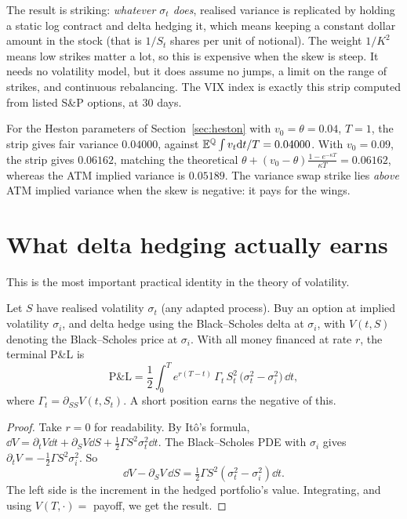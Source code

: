 \begin{intuition}
The result is striking: \emph{whatever $\sigma_t$ does}, realised variance is replicated by holding a static log contract and delta hedging it, which means keeping a constant dollar amount in the stock (that is $1/S_t$ shares per unit of notional). The weight $1/K^2$ means low strikes matter a lot, so this is expensive when the skew is steep. It needs no volatility model, but it does assume no jumps, a limit on the range of strikes, and continuous rebalancing. The VIX index is exactly this strip computed from listed S\&P options, at $30$ days.
\end{intuition}

\begin{numcheck}
For the Heston parameters of Section~\ref{sec:heston} with $v_0=\theta=0.04$, $T=1$, the strip gives fair variance $0.04000$, against $\mathbb{E}^{\mathbb{Q}}\int v_t\mathrm{d} t/T=0.04000$. With $v_0=0.09$, the strip gives $0.06162$, matching the theoretical $\theta+(v_0-\theta)\frac{1-e^{-\kappa T}}{\kappa T}=0.06162$, whereas the ATM implied variance is $0.05189$. The variance swap strike lies \emph{above} ATM implied variance when the skew is negative: it pays for the wings.
\end{numcheck}

\section{What delta hedging actually earns}\label{sec:gammapnl}

This is the most important practical identity in the theory of volatility.

\begin{theorem}[Hedging P\&L]\label{thm:hedgepnl}
Let $S$ have realised volatility $\sigma_t$ (any adapted process). Buy an option at implied volatility $\sigma_i$, and delta hedge using the Black--Scholes delta at $\sigma_i$, with $V(t,S)$ denoting the Black--Scholes price at $\sigma_i$. With all money financed at rate $r$, the terminal P\&L is
\[
\text{P\&L}=\frac12\int_0^Te^{r(T-t)}\,\Gamma_t\,S_t^2\,\bigl(\sigma_t^2-\sigma_i^2\bigr)\,\dd t,
\]
where $\Gamma_t=\partial_{SS}V(t,S_t)$. A short position earns the negative of this.
\end{theorem}
\begin{proof}
Take $r=0$ for readability. By It\^o's formula, $\dd V=\partial_tV\dd t+\partial_SV\dd S+\tfrac12\Gamma S^2\sigma_t^2\dd t$. The Black--Scholes PDE with $\sigma_i$ gives $\partial_tV=-\tfrac12\Gamma S^2\sigma_i^2$. So
\[
\dd V-\partial_SV\,\dd S=\tfrac12\Gamma S^2(\sigma_t^2-\sigma_i^2)\dd t.
\]
The left side is the increment in the hedged portfolio's value. Integrating, and using $V(T,\cdot)=$ payoff, we get the result.
\end{proof}

